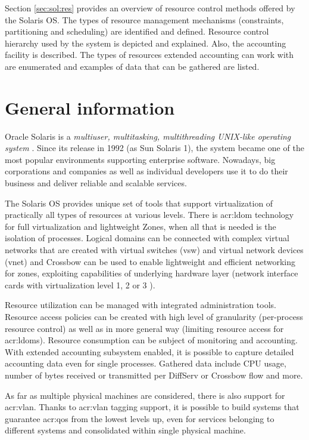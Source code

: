 \documentclass[11pt,openany]{book}
\begin{document}
    Section \ref{sec:sol:res} provides an overview of resource control methods offered by the Solaris OS. The types of
    resource management mechanisms (constraints, partitioning and scheduling) are identified and defined. Resource
    control hierarchy used by the system is depicted and explained. Also, the accounting facility is described. The
    types of resources extended accounting can work with are enumerated and examples of data that can be gathered are
    listed.


    \section{General information}
    \label{sec:sol:general}

      Oracle Solaris is a \textit{multiuser, multitasking, multithreading UNIX-like operating system} \cite{reference}.
      Since its release in 1992 (as Sun Solaris 1), the system became one of the most popular environments supporting
      enterprise software. Nowadays, big corporations and companies as well as individual developers use it to do their
      business and deliver reliable and scalable services.

      The Solaris OS provides unique set of tools that support virtualization of practically all types of resources at
      various levels. There is \gls{acr:ldom} technology for full virtualization and lightweight Zones, when all that is
      needed is the isolation of processes. Logical domains can be connected with complex virtual networks that are
      created with virtual switches (vsw) and virtual network devices (vnet) \cite{ldomag} and Crossbow can be used to
      enable lightweight and efficient networking for zones, exploiting capabilities of underlying hardware layer
      (network interface cards with virtualization level 1, 2 or 3 \cite{santos}).

      Resource utilization can be managed with integrated administration tools. Resource access policies can be created
      with high level of granularity (per-process resource control) as well as in more general way (limiting resource
      access for \gls{acr:ldom}s). Resource consumption can be subject of monitoring and accounting. With extended
      accounting subsystem enabled, it is possible to capture detailed accounting data even for single processes.
      Gathered data include CPU usage, number of bytes received or transmitted per DiffServ or Crossbow flow and more.

      As far as multiple physical machines are considered, there is also support for \gls{acr:vlan}.  Thanks to
      \gls{acr:vlan} tagging support, it is possible to build systems that guarantee \gls{acr:qos} from the lowest
      levels up, even for services belonging to different systems and consolidated within single physical machine.
\end{document}
